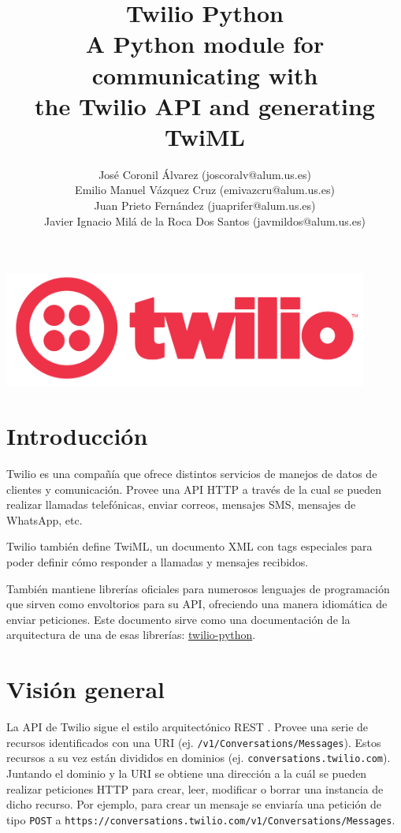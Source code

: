 \documentclass{article}
\title{%
  Twilio Python \\
  \large A Python module for communicating with \\
  the Twilio API and generating TwiML}
\author{José Coronil Álvarez (joscoralv@alum.us.es) \\
Emilio Manuel Vázquez Cruz (emivazcru@alum.us.es) \\
Juan Prieto Fernández (juaprifer@alum.us.es) \\
Javier Ignacio Milá de la Roca Dos Santos (javmildos@alum.us.es) \\}
\date{}
\begin{document}
\begin{titlepage}
  \centering
  \vfil
  {\bfseries\Large
      \thetitle
  }    
  \vfill
  \includegraphics[width=12cm]{logo.png} %
  \vfill
  \theauthor
\end{titlepage}

\tableofcontents

\newpage

\section{Introducción}

Twilio es una compañía que ofrece distintos servicios
de manejos de datos de clientes y comunicación.
Provee una API HTTP a través de la cual se pueden realizar llamadas telefónicas,
enviar correos, mensajes SMS, mensajes de WhatsApp, etc.

Twilio también define TwiML,
un documento XML con tags especiales
para poder definir cómo responder a llamadas y mensajes recibidos.

También mantiene librerías oficiales para numerosos lenguajes de programación
que sirven como envoltorios para su API,
ofreciendo una manera idiomática de enviar peticiones.
Este documento sirve como una documentación de la arquitectura
de una de esas librerías:
\href{https://github.com/twilio/twilio-python}{twilio-python}.


\section{Visión general}

La API de Twilio sigue el estilo arquitectónico REST \cite{twilio-rest}.
Provee una serie de recursos identificados con una URI
(ej. \verb|/v1/Conversations/Messages|).
Estos recursos a su vez están divididos en dominios
(ej. \verb|conversations.twilio.com|).
Juntando el dominio y la URI se obtiene una dirección
a la cuál se pueden realizar peticiones HTTP
para crear, leer, modificar o borrar una instancia de dicho recurso.
Por ejemplo, para crear un mensaje se enviaría una petición
de tipo \verb|POST|
a \verb|https://conversations.twilio.com/v1/Conversations/Messages|.
\end{document}
